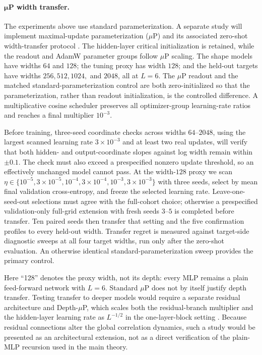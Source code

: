 \paragraph{\(\boldsymbol{\mu}\)P width transfer.}
The experiments above use standard parameterization. A separate study will implement maximal-update parameterization (\(\mu\)P) and its associated zero-shot width-transfer protocol \cite{yang2022tensorprogramsv}. The hidden-layer critical initialization is retained, while the readout and AdamW parameter groups follow \(\mu\)P scaling. The shape models have widths \(64\) and \(128\); the tuning proxy has width \(128\); and the held-out targets have widths \(256,512,1024,\) and \(2048\), all at \(L=6\). The \(\mu\)P readout and the matched standard-parameterization control are both zero-initialized so that the parameterization, rather than readout initialization, is the controlled difference. A multiplicative cosine scheduler preserves all optimizer-group learning-rate ratios and reaches a final multiplier \(10^{-3}\).

Before training, three-seed coordinate checks across widths \(64\)--\(2048\), using the largest scanned learning rate \(3\times10^{-3}\) and at least two real updates, will verify that both hidden- and output-coordinate slopes against log width remain within \(\pm0.1\). The check must also exceed a prespecified nonzero update threshold, so an effectively unchanged model cannot pass. At the width-\(128\) proxy we scan \(\eta\in\{10^{-5},3\!\times\!10^{-5},10^{-4},3\!\times\!10^{-4},10^{-3},3\!\times\!10^{-3}\}\) with three seeds, select by mean final validation cross-entropy, and freeze the selected learning rate. Leave-one-seed-out selections must agree with the full-cohort choice; otherwise a prespecified validation-only full-grid extension with fresh seeds \(3\)--\(5\) is completed before transfer. Ten paired seeds then transfer that setting and the five confirmation profiles to every held-out width. Transfer regret is measured against target-side diagnostic sweeps at all four target widths, run only after the zero-shot evaluation. An otherwise identical standard-parameterization sweep provides the primary control.

Here ``128'' denotes the proxy width, not its depth: every MLP remains a plain feed-forward network with \(L=6\). Standard \(\mu\)P does not by itself justify depth transfer. Testing transfer to deeper models would require a separate residual architecture and Depth-\(\mu\)P, which scales both the residual-branch multiplier and the hidden-layer learning rate as \(L^{-1/2}\) in the one-layer-block setting \cite{yang2023tensorprogramsvi}. Because residual connections alter the global correlation dynamics, such a study would be presented as an architectural extension, not as a direct verification of the plain-MLP recursion used in the main theory.

